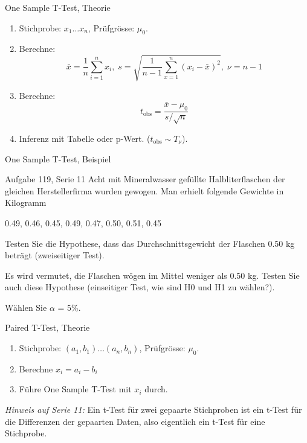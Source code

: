 \documentclass[handout]{beamer}
\begin{document}
\begin{frame}{One Sample T-Test, Theorie}
\begin{enumerate}
\item Stichprobe: $x_1\ldots x_n$, Prüfgrösse: $\mu_0$.
\item Berechne:
$$
\bar{x}=\frac{1}{n}\sum_{i=1}^n x_i,\;
s=\sqrt{\frac{1}{n-1}\sum_{x=1}^{n}(x_i-\bar{x})^2},\;
\nu=n-1
$$
\item Berechne:
$$
t_\text{obs}=\frac{\bar{x}-\mu_0}{s/\sqrt{n}}
$$
\item Inferenz mit Tabelle oder p-Wert. ($t_\text{obs}\sim T_\nu$).
\end{enumerate}
\end{frame}

\begin{frame}{One Sample T-Test, Beispiel}
\begin{beamerboxesrounded}[shadow]{Aufgabe 119, Serie 11}
Acht mit Mineralwasser gefüllte Halbliterflaschen der gleichen Herstellerfirma
wurden gewogen. Man erhielt folgende Gewichte in Kilogramm

\begin{center}
0.49, 0.46, 0.45, 0.49, 0.47, 0.50, 0.51, 0.45
\end{center}
\begin{outline}
\item Testen Sie die Hypothese, dass das Durchschnittsgewicht der Flaschen 0.50
kg beträgt (zweiseitiger Test).
\item Es wird vermutet, die Flaschen wögen im Mittel weniger als 0.50 kg.
Testen Sie auch diese Hypothese (einseitiger Test, wie sind H0 und H1 zu wählen?).
\end{outline}
Wählen Sie $\alpha$ = 5\%.
\end{beamerboxesrounded}
\end{frame}

\begin{frame}{Paired T-Test, Theorie}
\begin{enumerate}
\item Stichprobe: $(a_1, b_1)\ldots (a_n,b_n)$, Prüfgrösse: $\mu_0$.
\item Berechne $x_i=a_i-b_i$
\item Führe One Sample  T-Test mit $x_i$ durch.
\end{enumerate}
\vfill
\textit{Hinweis auf Serie 11:} Ein t-Test für zwei gepaarte Stichproben ist ein
t-Test für die Differenzen der gepaarten Daten, also eigentlich ein t-Test für
eine Stichprobe.
\end{frame}
\end{document}
